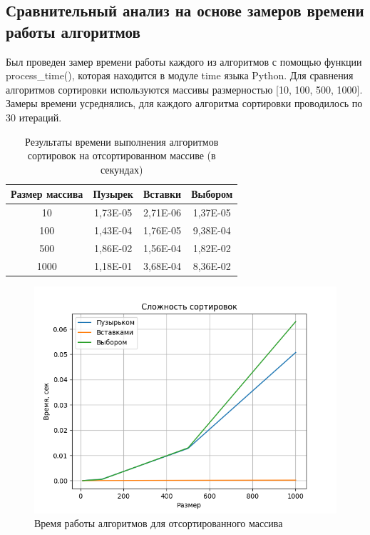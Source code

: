 \documentclass[14pt,russian]{scrartcl}
\begin{document}
\subsection{Сравнительный анализ на основе замеров времени работы алгоритмов}
	
	Был проведен замер времени работы каждого из алгоритмов с помощью функции process\_time(), которая находится в модуле time языка Python.
    Для сравнения алгоритмов сортировки используются массивы размерностью [10, 100, 500, 1000]. Замеры времени усреднялись, для каждого алгоритма сортировки проводилось по 30 итераций. \\

    \begin{table}[htb]
        \caption{\centering Результаты времени выполнения алгоритмов сортировок на отсортированном массиве (в секундах)}
        \centering
        \begin{tabular}{|c|c|c|c|}
        \hline
        Размер массива & Пузырек  & Вставки  & Выбором  \\ \hline
        10             & 1,73E-05 & 2,71E-06 & 1,37E-05 \\ \hline
        100            & 1,43E-04 & 1,76E-05 & 9,38E-04 \\ \hline
        500            & 1,86E-02 & 1,56E-04 & 1,82E-02 \\ \hline
        1000           & 1,18E-01 & 3,68E-04 & 8,36E-02 \\ \hline
        \end{tabular}
        \label{tab:sorted_bench}
    \end{table}

    \begin{figure}[htp]
	\centering
	\includegraphics[scale = 1]{sorted.png}
	\caption{Время работы алгоритмов для отсортированного массива}
	\label{fig:plot_sorted}
\end{figure}
\end{document}
